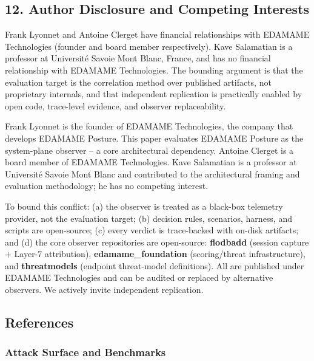 \documentclass[
]{article}
\begin{document}
\subsection{12. Author Disclosure and Competing
Interests}\label{author-disclosure-and-competing-interests}

Frank Lyonnet and Antoine Clerget have financial relationships with
EDAMAME Technologies (founder and board member respectively). Kave
Salamatian is a professor at Université Savoie Mont Blanc, France, and
has no financial relationship with EDAMAME Technologies. The bounding
argument is that the evaluation target is the correlation method over
published artifacts, not proprietary internals, and that independent
replication is practically enabled by open code, trace-level evidence,
and observer replaceability.

Frank Lyonnet is the founder of EDAMAME Technologies, the company that
develops EDAMAME Posture. This paper evaluates EDAMAME Posture as the
system-plane observer -- a core architectural dependency. Antoine
Clerget is a board member of EDAMAME Technologies. Kave Salamatian is a
professor at Université Savoie Mont Blanc and contributed to the
architectural framing and evaluation methodology; he has no competing
interest.

To bound this conflict: (a) the observer is treated as a black-box
telemetry provider, not the evaluation target; (b) decision rules,
scenarios, harness, and scripts are open-source; (c) every verdict is
trace-backed with on-disk artifacts; and (d) the core observer
repositories are open-source: \textbf{flodbadd} (session capture +
Layer-7 attribution), \textbf{edamame\_foundation} (scoring/threat
infrastructure), and \textbf{threatmodels} (endpoint threat-model
definitions). All are published under EDAMAME Technologies and can be
audited or replaced by alternative observers. We actively invite
independent replication.

\subsection{References}\label{references}

\subsubsection{Attack Surface and
Benchmarks}\label{attack-surface-and-benchmarks}
\end{document}
